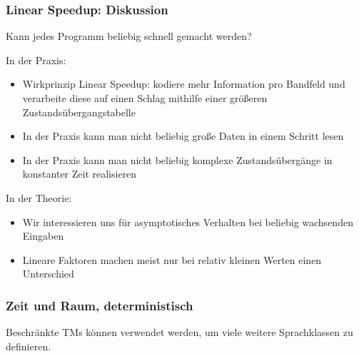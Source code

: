 \documentclass[aspectratio=1610,onlymath]{beamer}
\begin{document}
\begin{frame}\frametitle{Linear Speedup: Diskussion}

\alert{Kann jedes Programm beliebig schnell gemacht werden?}\bigskip\pause

In der Praxis: 
\begin{itemize}
\item Wirkprinzip Linear Speedup: kodiere mehr Information pro Bandfeld und verarbeite
diese auf einen Schlag mithilfe einer größeren Zustandsübergangstabelle
\item In der Praxis kann man nicht beliebig große Daten in einem Schritt lesen
\item In der Praxis kann man nicht beliebig komplexe Zustandsübergänge in konstanter
Zeit realisieren
\end{itemize}
\bigskip\pause

In der Theorie: 
\begin{itemize}
\item Wir interessieren uns für asymptotisches Verhalten bei beliebig wachsenden
	Eingaben
\item Lineare Faktoren machen meist nur bei relativ kleinen Werten einen Unterschied
\end{itemize}

\end{frame}


\begin{frame}\frametitle{Zeit und Raum, deterministisch}

Beschränkte TMs können verwendet werden, um viele weitere Sprachklassen zu definieren.
\medskip

\pause

\pause



\end{frame}
\end{document}
